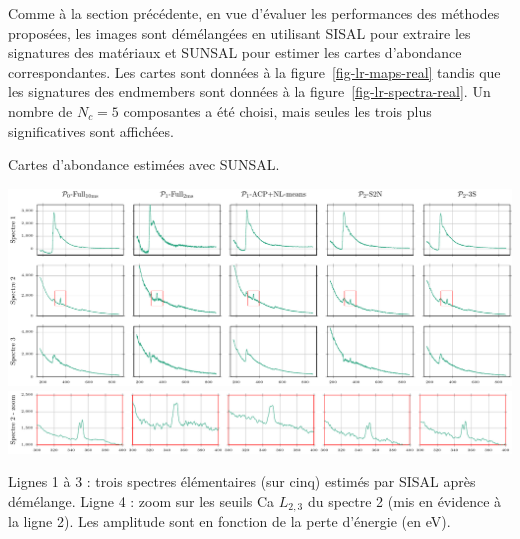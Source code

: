 Comme à la section précédente, en vue d'évaluer les performances des méthodes proposées, les images sont démélangées en utilisant SISAL pour extraire les signatures des matériaux et SUNSAL pour estimer les cartes d'abondance correspondantes. Les cartes sont données à la figure~\ref{fig-lr-maps-real} tandis que les signatures des endmembers sont données à la figure~\ref{fig-lr-spectra-real}. Un nombre de $N_c=5$ composantes a été choisi, mais seules les trois plus significatives sont affichées. 

%
\begin{normalfigure*}[hbtp]
    \centering
    
    \caption{Cartes d'abondance estimées avec SUNSAL.\protect\label{fig-lr-maps-real}}
\end{normalfigure*}
%
\begin{mylandscape}
    \begin{normalfigure}
        \centering
        \includegraphics[]{img/chapitre3/figure11/template.pdf}\\
        \includegraphics[]{img/chapitre3/figure11/spectrum-2-zoom.pdf}
        \caption{Lignes 1 à 3 : trois spectres élémentaires (sur cinq) estimés par SISAL après démélange. Ligne 4 : zoom sur les seuils Ca $L_{2, 3}$ du spectre 2 (mis en évidence à la ligne 2). Les amplitude sont en fonction de la perte d'énergie (en eV).\protect\label{fig-lr-spectra-real}}
    \end{normalfigure}
\end{mylandscape}


